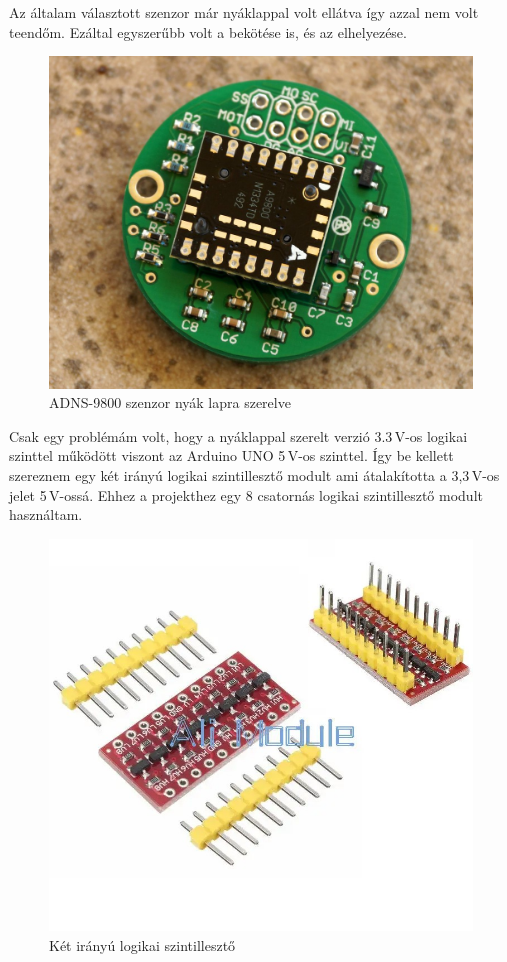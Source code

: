 \documentclass[]{thesis-ekf}
\theoremstyle{definition}
\theoremstyle{remark}
\begin{document}
Az általam választott szenzor már nyáklappal volt ellátva így azzal nem volt teendőm. Ezáltal egyszerűbb volt a bekötése is, és az elhelyezése.

\begin{figure}[th!]
	\centering
	\includegraphics[width=0.5\linewidth]{ADNS9800}
	\caption[ADNS9800]{ADNS-9800 szenzor nyák lapra szerelve}
	\label{fig:adns9800}
\end{figure}

Csak egy problémám volt, hogy a nyáklappal szerelt verzió 3.3\,V-os logikai szinttel működött viszont az Arduino UNO 5\,V-os szinttel. Így be kellett szereznem egy két irányú logikai szintillesztő modult ami átalakította a 3,3\,V-os jelet 5\,V-ossá. Ehhez a projekthez egy 8 csatornás logikai szintillesztő modult használtam.

\begin{figure}[th!]
	\centering
	\includegraphics[width=0.7\linewidth]{szintilleszto}
	\caption[Logikai szintillesztő]{Két irányú logikai szintillesztő}
	\label{fig:szintilleszto}
\end{figure}
\end{document}
